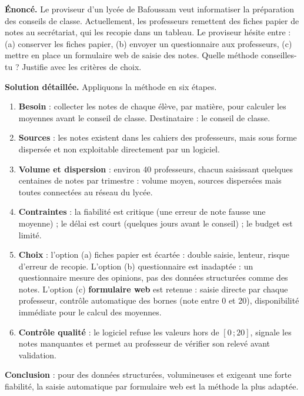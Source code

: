 \documentclass[11pt]{article}
\begin{document}
\begin{exoresolu}
\textbf{Énoncé.} Le proviseur d'un lycée de Bafoussam veut informatiser la préparation des conseils de classe. Actuellement, les professeurs remettent des fiches papier de notes au secrétariat, qui les recopie dans un tableau. Le proviseur hésite entre : (a) conserver les fiches papier, (b) envoyer un questionnaire aux professeurs, (c) mettre en place un formulaire web de saisie des notes. Quelle méthode conseilles-tu ? Justifie avec les critères de choix.

\tcblower
\textbf{Solution détaillée.} Appliquons la méthode en six étapes.
\begin{enumerate}
\item \textbf{Besoin} : collecter les notes de chaque élève, par matière, pour calculer les moyennes avant le conseil de classe. Destinataire : le conseil de classe.
\item \textbf{Sources} : les notes existent dans les cahiers des professeurs, mais sous forme dispersée et non exploitable directement par un logiciel.
\item \textbf{Volume et dispersion} : environ 40 professeurs, chacun saisissant quelques centaines de notes par trimestre : volume moyen, sources dispersées mais toutes connectées au réseau du lycée.
\item \textbf{Contraintes} : la fiabilité est critique (une erreur de note fausse une moyenne) ; le délai est court (quelques jours avant le conseil) ; le budget est limité.
\item \textbf{Choix} : l'option (a) fiches papier est écartée : double saisie, lenteur, risque d'erreur de recopie. L'option (b) questionnaire est inadaptée : un questionnaire mesure des opinions, pas des données structurées comme des notes. L'option (c) \textbf{formulaire web} est retenue : saisie directe par chaque professeur, contrôle automatique des bornes (note entre 0 et 20), disponibilité immédiate pour le calcul des moyennes.
\item \textbf{Contrôle qualité} : le logiciel refuse les valeurs hors de $[0\,;20]$, signale les notes manquantes et permet au professeur de vérifier son relevé avant validation.
\end{enumerate}
\textbf{Conclusion} : pour des données structurées, volumineuses et exigeant une forte fiabilité, la saisie automatique par formulaire web est la méthode la plus adaptée.
\end{exoresolu}
\end{document}
